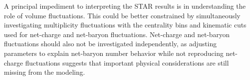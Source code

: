 A principal impediment to interpreting the STAR results is in understanding the role of volume fluctuations. This could be better constrained by simultaneously investigating multiplicity fluctuations with the centrality bins and kinematic cuts used for net-charge and net-baryon fluctuations. Net-charge and net-baryon fluctuations should also not be investigated independently, as adjusting parameters to explain net-baryon number behavior while not reproducing net-charge fluctuations suggests that important physical considerations are still missing from the modeling. 









